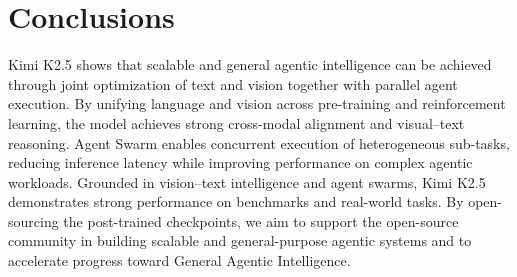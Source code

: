\section{Conclusions}
Kimi K2.5 shows that scalable and general agentic intelligence can be achieved through joint optimization of text and vision together with parallel agent execution. By unifying language and vision across pre-training and reinforcement learning, the model achieves strong cross-modal alignment and visual–text reasoning. Agent Swarm enables concurrent execution of heterogeneous sub-tasks, reducing inference latency while improving performance on complex agentic workloads. Grounded in vision–text intelligence and agent swarms, Kimi K2.5 demonstrates strong performance on benchmarks and real-world tasks. By open-sourcing the post-trained checkpoints, we aim to support the open-source community in building scalable and general-purpose agentic systems and to accelerate progress toward General Agentic Intelligence.